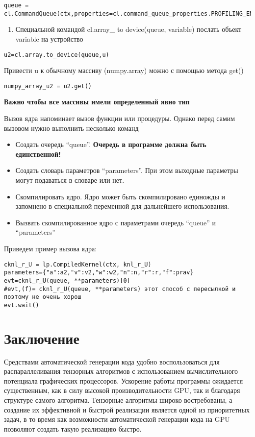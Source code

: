 \documentclass{scrartcl}
\begin{document}
\begin{verbatim}
queue = cl.CommandQueue(ctx,properties=cl.command_queue_properties.PROFILING_ENABLE)
\end{verbatim}
\begin{enumerate}
\item Специальной командой cl.array\_{} to device(queue, variable) послать объект variable на устройство
\end{enumerate}

\begin{verbatim}
u2=cl.array.to_device(queue,u)
\end{verbatim}
Привести u к обычному массиву (numpy.array) можно с помощью метода get()

\begin{verbatim}
numpy_array_u2 = u2.get()
\end{verbatim}
\bfseries Важно чтобы все массивы имели определенный явно тип \mdseries
 
Вызов ядра напоминает вызов функции или процедуры. Однако перед самим вызовом нужно
выполнить несколько команд
\begin{itemize}
\item Создать очередь ``queue''. \bfseries Очередь в программе должна быть единственной! \mdseries
\item Создать словарь параметров ``parameters''. При этом выходные параметры могут подаваться в словаре или нет.
\item Скомпилировать ядро. Ядро может быть скомпилировано единожды и запомнено в специальной переменной для дальнейшего использования.
\item Вызвать скомпилированное ядро с параметрами очередь ``queue'' и ``parameters''
\end{itemize}
Приведем пример вызова ядра:

\begin{verbatim}
cknl_r_U = lp.CompiledKernel(ctx, knl_r_U)
parameters={"a":a2,"v":v2,"w":w2,"n":n,"r":r,"f":prav}
evt=cknl_r_U(queue, **parameters)[0]
#evt,(f)= cknl_r_U(queue, **parameters) этот способ с пересылкой и поэтому не очень хорош
evt.wait()
\end{verbatim}
\section{Заключение}
\label{sec-9}

Средствами автоматической генерации кода удобно воспользоваться для распараллеливания
тензорных алгоритмов с использованием вычислительного потенциала графических процессоров.
Ускорение работы программы ожидается существенным, как в силу высокой производительности GPU,
так и благодаря структуре самого алгоритма. Тензорные алгоритмы широко востребованы,
а создание их эффективной и быстрой реализации является одной из приоритетных задач,
в то время как возможности автоматической генерации кода на GPU позволяют создать такую 
реализацию быстро.
 


\end{document}
